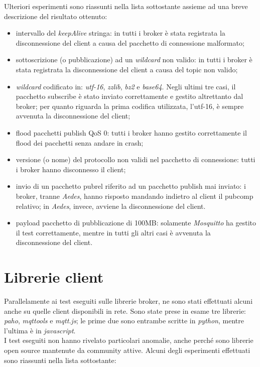\documentclass[binding=0.6cm,TFA]{sapthesis}
\begin{document}
\begin{large}
Ulteriori esperimenti sono riassunti nella lista sottostante assieme ad una breve descrizione del risultato ottenuto:

\begin{itemize}
\item intervallo del \textit{keepAlive} stringa: in tutti i broker è stata registrata la disconnessione del client a causa del pacchetto di connessione malformato;
\item sottoscrizione (o pubblicazione) ad un \textit{wildcard} non valido: in tutti i broker è stata registrata la disconnessione del client a causa del topic non valido;
\item \textit{wildcard} codificato in: \textit{utf-16}, \textit{zzlib}, \textit{bz2} e \textit{base64}. Negli ultimi tre casi, il pacchetto subscribe è stato inviato correttamente e gestito altrettanto dal broker; per quanto riguarda la prima codifica utilizzata, l'utf-16, è sempre avvenuta la disconnessione del client;
\item flood pacchetti publish QoS 0: tutti i broker hanno gestito correttamente il flood dei pacchetti senza andare in crash;
\item versione (o nome) del protocollo non validi nel pacchetto di connessione: tutti i broker hanno disconnesso il client;
\item invio di un pacchetto pubrel riferito ad un pacchetto publish mai inviato: i broker, tranne \textit{Aedes}, hanno risposto mandando indietro al client il pubcomp relativo; in \textit{Aedes}, invece, avviene la disconnessione del client.
\item payload pacchetto di pubblicazione di 100MB: solamente \textit{Mosquitto} ha gestito il test correttamente, mentre in tutti gli altri casi è avvenuta la disconnessione del client.
\end{itemize}

\section{Librerie client}
Parallelamente ai test eseguiti sulle librerie broker, ne sono stati effettuati alcuni anche su quelle client disponibili in rete. Sono state prese in esame tre librerie: \textit{paho}, \textit{mqttools} e \textit{mqtt.js}; le prime due sono entrambe scritte in \textit{python}, mentre l'ultima è in \textit{javascript}. \\

I test eseguiti non hanno rivelato particolari anomalie, anche perché sono librerie open source mantenute da community attive. Alcuni degli esperimenti effettuati sono riassunti nella lista sottostante:


\end{large}
\end{document}
